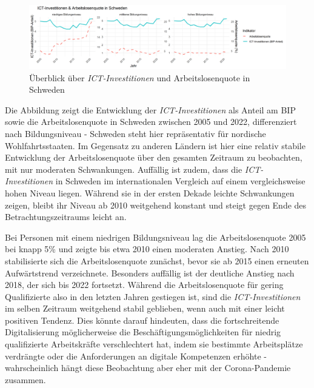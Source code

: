 \begin{figure}[htbp]
    \centering
    \includegraphics[width=\textwidth]{assets/plot_sweden_final.png}
    \caption{Überblick über \textit{\ac{ICT}-Investitionen} und Arbeitslosenquote in 
    Schweden}
    \label{fig:sweden}
\end{figure}

Die Abbildung zeigt die Entwicklung der \textit{\ac{ICT}-Investitionen} als Anteil 
am BIP sowie die Arbeitslosenquote in Schweden zwischen 2005 und 2022, differenziert 
nach Bildungsniveau - Schweden steht hier repräsentativ für nordische 
Wohlfahrtsstaaten. Im Gegensatz zu anderen Ländern ist hier eine relativ stabile 
Entwicklung der Arbeitslosenquote über den gesamten Zeitraum zu beobachten, mit nur 
moderaten Schwankungen. Auffällig ist zudem, dass die \textit{\ac{ICT}-Investitionen} 
in Schweden im internationalen Vergleich auf einem vergleichsweise hohen Niveau liegen. 
Während sie in der ersten Dekade leichte Schwankungen zeigen, bleibt ihr Niveau ab 
2010 weitgehend konstant und steigt gegen Ende des Betrachtungszeitraums leicht an.

Bei Personen mit einem niedrigen Bildungsniveau lag die Arbeitslosenquote 2005 bei knapp 
5\% und zeigte bis etwa 2010 einen moderaten Anstieg. Nach 2010 stabilisierte sich die 
Arbeitslosenquote zunächst, bevor sie ab 2015 einen erneuten Aufwärtstrend verzeichnete. 
Besonders auffällig ist der deutliche Anstieg nach 2018, der sich bis 2022 fortsetzt. 
Während die Arbeitslosenquote für gering Qualifizierte also in den letzten Jahren 
gestiegen ist, sind die \textit{\ac{ICT}-Investitionen} im selben Zeitraum weitgehend 
stabil geblieben, wenn auch mit einer leicht positiven Tendenz. Dies könnte darauf 
hindeuten, dass die fortschreitende Digitalisierung möglicherweise die 
Beschäftigungsmöglichkeiten für niedrig qualifizierte Arbeitskräfte verschlechtert hat, 
indem sie bestimmte Arbeitsplätze verdrängte oder die Anforderungen an digitale 
Kompetenzen erhöhte - wahrscheinlich hängt diese Beobachtung aber eher mit der 
Corona-Pandemie zusammen.

